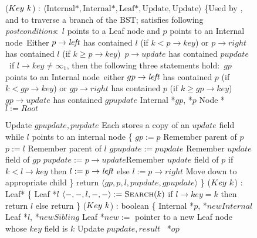 \begin{figure}[H]
	\scriptsize
	\begin{code}
		\firstline
		($Key\ k$) : $\langle \mbox{Internal*}, \mbox{Internal*}, \mbox{Leaf*}, \mbox{Update}, \mbox{Update}\rangle$  \{\ul
		\n \com Used by ,  and  to traverse a branch of the BST; satisfies following {\it postconditions}:\ul
		\com \postnotnull\ $l$ points to a Leaf node and $p$ points to an Internal node\ul
		\com \postl\ Either $p\rightarrow \mbox{\it left}$ has contained $l$ (if $k<p\rightarrow key$) or $p\rightarrow right$ has contained $l$ (if $k\geq p\rightarrow key$)\ul
		\com \postpup\ $p\rightarrow update$ has contained $pupdate$\ul
		\com \postnonempty\ if $l\rightarrow key\neq \infty_1$, then the following three statements hold:\ul
		\com \hspace*{3mm}\postgpnotnull\ $gp$ points to an Internal node\ul
		\com \hspace*{3mm}\postp\ either $gp\rightarrow \mbox{\it left}$ has contained $p$ (if $k<gp\rightarrow key$) or $gp\rightarrow right$ has contained $p$ (if $k\geq gp\rightarrow key$)\ul
		\com \hspace*{3mm}\postgpup\ $gp\rightarrow update$ has contained $gpupdate$\nlc
		Internal *$gp$, *$p$\nlc
		Node *$l:= Root$  \label{restart-search}\nlc
		
		Update $gpupdate, pupdate$ \tabtabcom Each stores a copy of an $update$ field\bl\nlc
		while $l$ points to an internal node \{ \nlc%
		\n         $gp := p$ \tabtabcom Remember parent of $p$\nlc
		$p := l$ \tabtabcom Remember parent of $l$\nlc
		$gpupdate := pupdate$ \tabtabcom Remember $update$ field of $gp$\nlc
		$pupdate := p\rightarrow update$\label{store-pupdate}\tabtabcom Remember $update$ field of $p$\nlc  
		if $k < l\rightarrow key$ then $l:= p\rightarrow \mbox{\it left}$ else $l:=p \rightarrow right$ \label{read-child}\tabtabcom Move down to appropriate child\nlc
		\p \} \nlc
		return $\langle gp, p, l, pupdate, gpupdate \rangle$ \nlc
		\p 
		\}\bl
		\nlc
		($Key\ k$) : Leaf* \{ \nlc
		\n   Leaf *$l$\bl
		\nlc
		$\langle -,-,l,-,-\rangle := \mbox{\sc Search}(k)$\nlc
		if $l\rightarrow key = k$ then return $l$\nlc
		else return \NULL\nlc
		\p
		\}\bl
		\nlc
		($Key\ k$) : boolean \{ \nlc
		\n Internal *$p$, *$newInternal$ \label{BSTInsert-entry} \nlc 
		Leaf *$l$, *$newSibling$\nlc 
		Leaf *$new :=$ pointer to a new Leaf node whose $key$ field is $k$  \nlc
		Update $pupdate, result$\nlc
		\IFlag\ *$op$\bl\nlc%
		

\end{code}
\end{figure}
